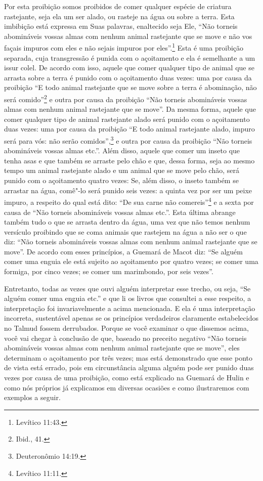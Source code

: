 \begin{multicols}{2}
Por esta proibição somos proibidos de comer qualquer espécie de
criatura rastejante, seja ela um ser alado, ou rasteje na água ou sobre
a terra.
Esta imbibição está expressa em Suas palavras, enaltecido seja Ele,
``Não torneis abomináveis vossas almas com nenhum animal rastejante que se move e
não vos façais impuros com eles e não sejais impuros por eles''.\footnote{Levítico
11:43.} Esta é uma proibição separada, cuja transgressão é punida com o
açoitamento e ela é semelhante a um issur colel\starr. De acordo com isso,
aquele que comer qualquer tipo de animal que se arrasta sobre a terra é punido com
o açoitamento duas vezes: uma por causa da proibição ``E todo animal
rastejante que se move sobre a terra é abominação, não será comido''\footnote{Ibid., 41.} e
outra por causa da proibição ``Não torneis abomináveis vossas almas com
nenhum animal rastejante que se move''. Da mesma forma, aquele que comer
qualquer tipo de animal rastejante alado será punido com o açoitamento duas
vezes: uma por causa da proibição ``E todo animal rastejante alado, impuro será
para vós: não serão comidos'',\footnote{Deuteronômio 14:19.} e outra por causa da proibição
``Não torneis abomináveis vossas almas etc.''. Além disso, aquele que comer um
inseto que tenha asas e que também se arraste pelo chão e que, dessa
forma, seja ao mesmo tempo um animal rastejante alado e um animal que se move pelo
chão, será punido com o açoitamento quatro vezes: Se, além disso, o
inseto também se arrastar na água, comê"-lo será punido seis vezes: a quinta vez
por ser um peixe impuro, a respeito do qual está dito: ``De sua carne
não comereis''\footnote{Levítico 11:11.} e a sexta por causa de ``Não torneis
abomináveis vossas almas etc.''. Esta última abrange também tudo o que
se arrasta dentro da água, uma vez que não temos nenhum versículo
proibindo que se coma animais que rastejem na água a não ser o que diz:
``Não torneis abomináveis vossas almas com nenhum animal rastejante que
se move''. De acordo com esses princípios, a Guemará\starr{} de Macot\starr{} diz: ``Se
alguém comer uma enguia ele está sujeito ao açoitamento por quatro
vezes; se comer uma formiga, por cinco vezes; se comer um marimbondo,
por seis vezes''.

Entretanto, todas as vezes que ouvi alguém interpretar esse trecho, ou
seja, ``Se alguém comer uma enguia etc.'' e que li os livros que
consultei a esse respeito, a interpretação foi invariavelmente a acima
mencionada. E ela é uma interpretação incorreta, sustentável apenas se
os princípios verdadeiros claramente estabelecidos no Talmud\starr{} fossem
derrubados. Porque se você examinar o que dissemos acima, você vai
chegar à conclusão de que, baseado no preceito negativo ``Não torneis
abomináveis vossas almas com nenhum animal rastejante que se move'',
eles determinam o açoitamento por três vezes; mas está demonstrado que
esse ponto de vista está errado, pois em circunstância alguma alguém
pode ser punido duas vezes por causa de uma proibição, como está
explicado na Guemará\starr{} de Hulin\starr{} e como nós próprios já explicamos em
diversas ocasiões e como ilustraremos com exemplos a seguir.


\end{multicols}
